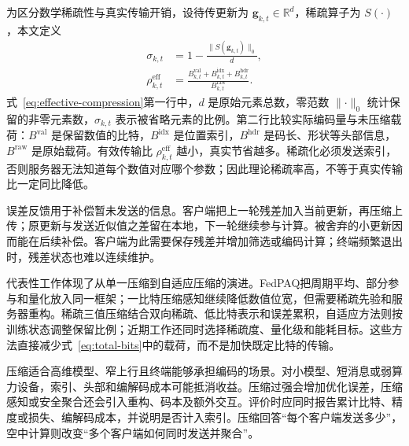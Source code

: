 为区分数学稀疏性与真实传输开销，设待传更新为 \(\bm g_{k,t}\in\mathbb R^d\)，稀疏算子为 \(S(\cdot)\)，本文定义
\begin{equation}\label{eq:effective-compression}
  \begin{aligned}
    \sigma_{k,t}
      &=1-\frac{\lVert S(\bm g_{k,t})\rVert_0}{d},\\
    \rho_{k,t}^{\mathrm{eff}}
      &=\frac{B_{k,t}^{\mathrm{val}}+B_{k,t}^{\mathrm{idx}}
      +B_{k,t}^{\mathrm{hdr}}}{B_{k,t}^{\mathrm{raw}}}.
  \end{aligned}
\end{equation}
式~\eqref{eq:effective-compression}第一行中，\(d\) 是原始元素总数，零范数 \(\lVert\cdot\rVert_0\) 统计保留的非零元素数，\(\sigma_{k,t}\) 表示被省略元素的\mbox{比例}。第二行比较实际编码量与未压缩载荷：\(B^{\mathrm{val}}\) 是保留数值的比特，\(B^{\mathrm{idx}}\) 是位置索引，\(B^{\mathrm{hdr}}\) 是码长、形状等头部信息，\(B^{\mathrm{raw}}\) 是原始载荷。有效传输比 \(\rho_{k,t}^{\mathrm{eff}}\) 越小，真实节省越多。稀疏化必须发送索引，否则服务器无法知道每个数值对应哪个参数；因此理论稀疏率高，不等于真实传输比一定同比降低。

误差反馈用于补偿暂未发送的信息。客户端把上一轮残差加入当前更新，再压缩上传；原更新与发送近似值之差留在本地，下一轮继续参与计算。被舍弃的小更新因而能在后续补偿。客户端为此需要保存残差并增加筛选或编码计算；终端频繁退出时，残差状态也难以连续维护\cite{Sattler2020STC,Han2020AdaptiveSparsification,Tian2022GradientCompression}。

代表性工作体现了从单一压缩到自适应压缩的演进。FedPAQ把周期平均、部分参与和量化放入同一框架；一比特压缩感知继续降低数值位宽，但需要稀疏先验和服务器重构\cite{Reisizadeh2020FedPAQ,Zhang2022OneBitCS}。稀疏三值压缩结合双向稀疏、低比特表示和误差累积，自适应方法则按训练状态调整保留比例；近期工作还同时选择稀疏度、量化级和能耗目标\cite{Sattler2020STC,Han2020AdaptiveSparsification,Tian2022GradientCompression,Marnissi2024AdaptiveSQ,Chen2025EdgeAssistedSparsification}。这些方法直接减少式~\eqref{eq:total-bits}中的载荷，而不是加快既定比特的传输。

压缩适合高维模型、窄上行且终端能够承担编码的场景。对小模型、短消息或弱算力设备，索引、头部和编解码成本可能抵消收益。压缩过强会增加优化误差，压缩感知或安全聚合还会引入重构、码本及额外交互\cite{Chen2022SecureCompressedFL}。评价时应同时报告累计比特、精度或损失、编解码成本，并说明是否计入索引。压缩回答“每个客户端发送多少”，空中计算则改变“多个客户端如何同时发送并聚合”。
